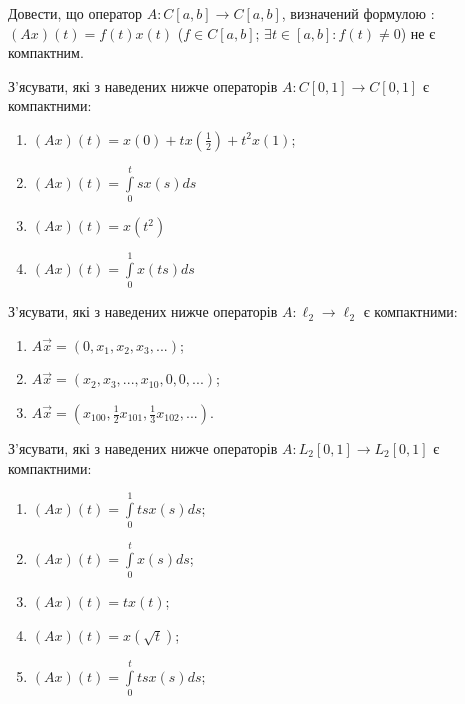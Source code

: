 
\begin{exercise}\label{N:1_5_14}
    Довести, що оператор $A: C[a, b] \rightarrow C[a, b]$, визначений формулою : $(Ax)(t) = 
    f(t)x(t)$ ($f \in C[a, b]$; $\exists t \in [a, b] : f(t) \neq 0$) не є компактним.
\end{exercise}

\begin{exercise}\label{N:1_5_15}
    З'ясувати, які з наведених нижче операторів $A : C[0, 1] \rightarrow C[0, 1]$ 
    є компактними:
    \begin{enumerate}
        \item $(Ax)(t) = x(0) + tx(\frac{1}{2}) + t^2 x(1)$;
        \item $(Ax)(t) = \int\limits_0^t sx(s) ds$
        \item $(Ax)(t) = x(t^2)$
        \item $(Ax)(t) = \int\limits_0^1 x(ts) ds$
    \end{enumerate}
\end{exercise}

\begin{exercise}
    З'ясувати, які з наведених нижче операторів $A : \ell_2 \rightarrow \ell_2$ 
    є компактними:
    \begin{enumerate}
        \item $A\vec{x} = (0, x_1, x_2, x_3, ...)$;
        \item $A\vec{x} = (x_2, x_3, ..., x_{10}, 0, 0, ...)$;
        \item $A\vec{x} = (x_{100}, \frac{1}{2}x_{101} ,\frac{1}{3}x_{102}, ...)$.
    \end{enumerate}
\end{exercise}

\begin{exercise}\label{N:1_5_17}
    З'ясувати, які з наведених нижче операторів $A : L_2[0, 1] \rightarrow L_2[0, 1]$ 
    є компактними:
    \begin{enumerate}
        \item $(Ax)(t) = \int\limits_0^1 tsx(s) ds$;
        \item $(Ax)(t) = \int\limits_0^t x(s) ds$;
        \item $(Ax)(t) = t x(t)$;
        \item $(Ax)(t) = x(\sqrt{t})$;
        \item $(Ax)(t) = \int\limits_0^t tsx(s) ds$;
    \end{enumerate}
\end{exercise}

